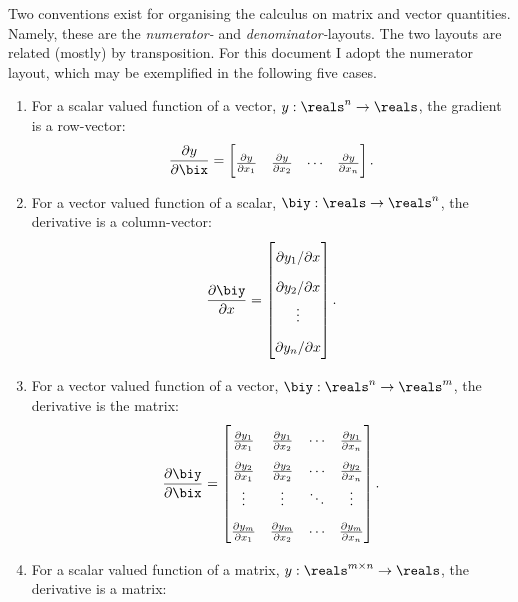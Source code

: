 Two conventions exist for organising the calculus on matrix and vector
quantities. Namely, these are the \emph{numerator-} and
\emph{denominator-}layouts.
The two layouts are related (mostly) by transposition. For this document I adopt
the numerator layout, which may be exemplified in the following five cases.
\begin{enumerate}
  \item For a scalar valued function of a vector, $y : \reals^n\rightarrow \reals$, the gradient is a row-vector: \begin{equation*}
    \pdiff{y}{\bix} = \begin{bmatrix}
     \pdiff{y}{x_1} & \pdiff{y}{x_2} & \cdots & \pdiff{y}{x_n}\\
     \end{bmatrix}.
    \end{equation*}
  \item For a vector valued function of a scalar, $\biy : \reals\rightarrow\reals^n$, the derivative is a column-vector: \begin{equation*}
    \pdiff{\biy}{x} = \begin{bmatrix}
     \ipdiff{y_1}{x} \\ \ipdiff{y_2}{x} \\ \vdots \\ \ipdiff{y_n}{x}
     \end{bmatrix}.
    \end{equation*}
  \item For a vector valued function of a vector, $\biy: \reals^n\rightarrow\reals^m$, the derivative is the matrix:  \begin{equation*}\renewcommand{\arraystretch}{1.8}
    \pdiff{\biy}{\bix} = \begin{bmatrix}
      \pdiff{y_1}{x_1} & \pdiff{y_1}{x_2} & \cdots & \pdiff{y_1}{x_n}\\
      \pdiff{y_2}{x_1} & \pdiff{y_2}{x_2} & \cdots & \pdiff{y_2}{x_n}\\
          \vdots       &      \vdots      & \ddots &       \vdots     \\
      \pdiff{y_m}{x_1} & \pdiff{y_m}{x_2} & \cdots & \pdiff{y_m}{x_n}\\
    \end{bmatrix}.
  \end{equation*}
  \item For a scalar valued function of a matrix, $y : \reals^{m\times n}\rightarrow \reals$, the derivative is a matrix: \begin{equation*}\renewcommand{\arraystretch}{1.8}

\end{equation*}
\end{enumerate}
